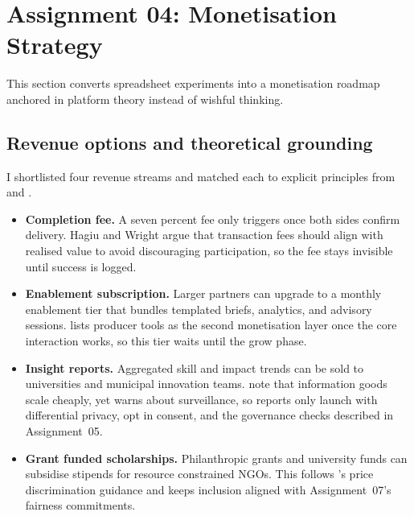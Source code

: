 \section*{Assignment 04: Monetisation Strategy}

This section converts spreadsheet experiments into a monetisation roadmap anchored in platform theory instead of wishful thinking.

\subsection*{Revenue options and theoretical grounding}
I shortlisted four revenue streams and matched each to explicit principles from \citet{Choudary2016} and \citet{HagiuWright2013}.
\begin{itemize}
  \item \textbf{Completion fee.} A seven percent fee only triggers once both sides confirm delivery. Hagiu and Wright argue that transaction fees should align with realised value to avoid discouraging participation, so the fee stays invisible until success is logged.
  \item \textbf{Enablement subscription.} Larger partners can upgrade to a monthly enablement tier that bundles templated briefs, analytics, and advisory sessions. \citet{Choudary2016} lists producer tools as the second monetisation layer once the core interaction works, so this tier waits until the grow phase.
  \item \textbf{Insight reports.} Aggregated skill and impact trends can be sold to universities and municipal innovation teams. \citet{ShapiroVarian1999} note that information goods scale cheaply, yet \citet{Zuboff2019} warns about surveillance, so reports only launch with differential privacy, opt in consent, and the governance checks described in Assignment~05.
  \item \textbf{Grant funded scholarships.} Philanthropic grants and university funds can subsidise stipends for resource constrained NGOs. This follows \citet{ShapiroVarian1999}'s price discrimination guidance and keeps inclusion aligned with Assignment~07's fairness commitments.
\end{itemize}

